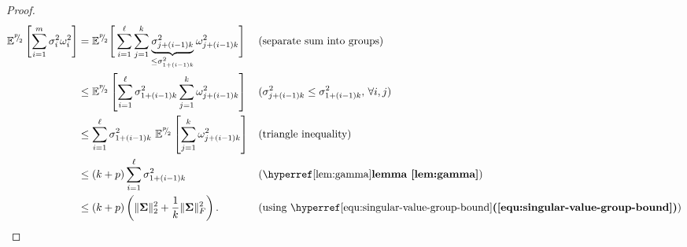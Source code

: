 \documentclass[12pt]{article}
\begin{document}
\begin{proof}
\begin{align}
        \mathbb{E}^{\sfrac{p}{2}}\left[ \sum_{i=1}^{m} \sigma_i^2 \omega_i^2 \right]
        &= \mathbb{E}^{\sfrac{p}{2}}\Bigg[ \sum_{i=1}^{\ell} \sum_{j=1}^{k} \underbrace{\sigma_{j + (i-1)k}^2}_{\leq \sigma_{1 + (i-1)k}^2} \omega_{j + (i-1)k}^2 \Bigg] && \text{(separate sum into groups)} \notag \\
        &\leq \mathbb{E}^{\sfrac{p}{2}}\left[ \sum_{i=1}^{\ell} \sigma_{1 + (i-1)k}^2 \sum_{j=1}^{k} \omega_{j + (i-1)k}^2 \right] && \text{($\sigma_{j + (i-1)k}^2 \leq \sigma_{1 + (i-1)k}^2$, $\forall i, j$)} \notag \\
        &\leq \sum_{i=1}^{\ell} \sigma_{1 + (i-1)k}^2 ~ \mathbb{E}^{\sfrac{p}{2}}\left[ \sum_{j=1}^{k} \omega_{j + (i-1)k}^2 \right] && \text{(triangle inequality)} \notag \\
        &\leq (k + p) \sum_{i=1}^{\ell} \sigma_{1 + (i-1)k}^2 && \text{(\reflem{lem:gamma})} \notag \\
        &\leq (k + p) \left( \lVert \mtx{\Sigma} \rVert _2^2 + \frac{1}{k} \lVert \mtx{\Sigma} \rVert _F^2 \right). && \text{(using \refequ{equ:singular-value-group-bound})}
    \end{align}
    

\end{proof}
\end{document}
